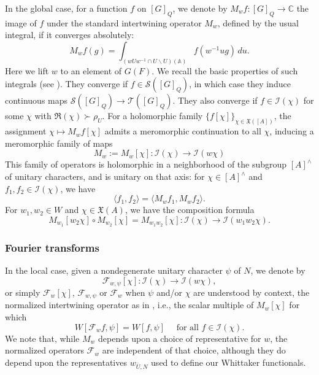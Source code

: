 \documentclass[reqno]{amsart}
\theoremstyle{plain} \newtheorem{theorem} {Theorem}
\theoremstyle{definition} \newtheorem{definition} [theorem] {Definition}
\theoremstyle{itplain} %
\numberwithin{equation}{section}
\numberwithin{theorem}{section}
\begin{document}
In the global case, for a function $f$ on $[G]_Q$, we denote by $M_w f : [G]_Q \rightarrow \mathbb{C}$ the image of $f$ under the standard intertwining operator $M_w$, defined by the usual integral, if it converges absolutely:
\begin{equation*}
  M_w f(g) = \int _{(w U w^{-1} \cap U \backslash U)(\mathbb{A})}
  f(w^{-1} u g) \, d u.
\end{equation*}
Here we lift $w$ to an element of $G(F)$.  We recall the basic properties of such integrals (see \cite{MR546601, 2019arXiv191102342B, MR2402686}).  They converge if $f \in \mathcal{S}([G]_Q)$, in which case they induce continuous maps $\mathcal{S}([G]_Q) \rightarrow \mathcal{T}([G]_Q)$.  They also converge if $f \in \mathcal{I}(\chi)$ for some $\chi$ with $\Re(\chi) \succ \rho_U$.  For a holomorphic family $\{f[\chi]\}_{\chi \in \mathfrak{X}([A])}$, the assignment $\chi \mapsto M_w f[\chi]$ admits a meromorphic continuation to all $\chi$, inducing a meromorphic family of maps
\begin{equation*}
  M_w := M_w[\chi] : \mathcal{I}(\chi) \rightarrow \mathcal{I}(w \chi)
\end{equation*}
This family of operators is holomorphic in a neighborhood of the subgroup $[A]^\wedge$ of unitary characters, and is unitary on that axis: for $\chi \in [A]^\wedge$ and $f_1, f_2 \in \mathcal{I}(\chi)$, we have
\begin{equation}\label{eq:langle-f_1-f_2}
\langle f_1, f_2 \rangle = \langle M_w f_1, M_w f_2 \rangle.
\end{equation}
For $w_1, w_2 \in W$ and $\chi \in \mathfrak{X}(A)$, we have the composition formula
\begin{equation}\label{eq:m_w_1w_2-chi-circ}
  M_{w_1}[w_2 \chi] \circ M_{w_2}[\chi] = M_{w_1 w_2}[\chi] : \mathcal{I}(\chi) \rightarrow \mathcal{I}(w_1 w_2 \chi).
\end{equation}


\subsubsection{Fourier transforms}\label{sec:fourier-transforms}
In the local case, given a nondegenerate unitary character $\psi$ of $N$, we denote by 
\begin{equation*}
  \mathcal{F}_{w,\psi}[\chi] : \mathcal{I}(\chi) \rightarrow \mathcal{I}(w \chi),
\end{equation*}
or simply $\mathcal{F}_{w}[\chi]$, $\mathcal{F}_{w,\psi}$ or $\mathcal{F}_w$ when $\psi$ and/or $\chi$ are understood by context, the normalized intertwining operator as in \cite[p336]{MR610479}, i.e., the scalar multiple of $M_w[\chi]$ for which
\begin{equation}\label{eq:wmathcalf_w-fchi-psi}
  W[\mathcal{F}_w f, \psi] = W[f,\psi] \quad \text{ for all } f \in \mathcal{I}(\chi).
\end{equation}
We note that, while $M_w$ depends upon a choice of representative for $w$, the normalized operators $\mathcal{F}_{w}$ are independent of that choice, although they do depend upon the representatives $w_{\bar{U},N}$ used to define our Whittaker functionals.
\end{document}
